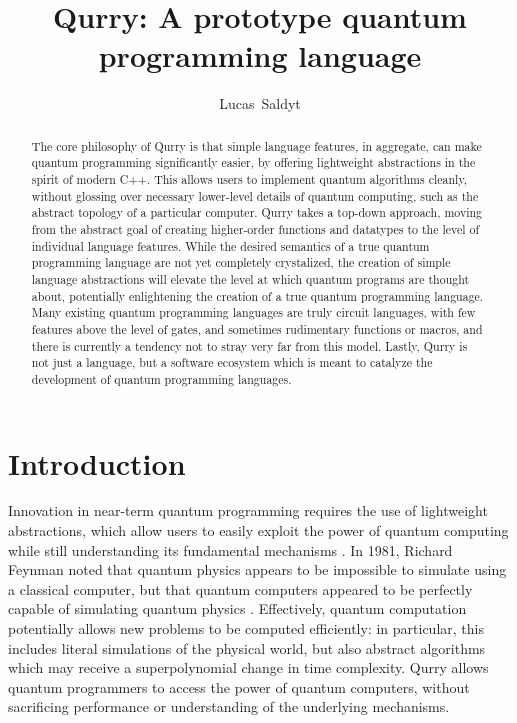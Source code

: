 \documentclass[a4paper,twocolumn,11pt,accepted=2017-05-09]{quantumarticle}
\begin{document}
\title{Qurry: A prototype quantum programming language}

\author{Lucas~Saldyt}
\maketitle

\begin{abstract}
     The core philosophy of Qurry is that simple language features, in aggregate, can make quantum programming significantly easier, by offering lightweight abstractions in the spirit of modern C++.
    This allows users to implement quantum algorithms cleanly, without glossing over necessary lower-level details of quantum computing, such as the abstract topology of a particular computer.
    Qurry takes a top-down approach, moving from the abstract goal of creating higher-order functions and datatypes to the level of individual language features.
    While the desired semantics of a true quantum programming language are not yet completely crystalized, the creation of simple language abstractions will elevate the level at which quantum programs are thought about, potentially enlightening the creation of a true quantum programming language.
    Many existing quantum programming languages are truly circuit languages, with few features above the level of gates, and sometimes rudimentary functions or macros, and there is currently a tendency not to stray very far from this model.
    Lastly, Qurry is not just a language, but a software ecosystem which is meant to catalyze the development of quantum programming languages.
\end{abstract}

\section{Introduction}

Innovation in near-term quantum programming requires the use of lightweight abstractions, which allow users to easily exploit the power of quantum computing while still understanding its fundamental mechanisms \cite{stroustrup}.
In 1981, Richard Feynman noted that quantum physics appears to be impossible to simulate using a classical computer, but that quantum computers appeared to be perfectly capable of simulating quantum physics \cite{feynman_1981}.
Effectively, quantum computation potentially allows new problems to be computed efficiently: in particular, this includes literal simulations of the physical world, but also abstract algorithms which may receive a superpolynomial change in time complexity.
Qurry allows quantum programmers to access the power of quantum computers, without sacrificing performance or understanding of the underlying mechanisms.
\end{document}
